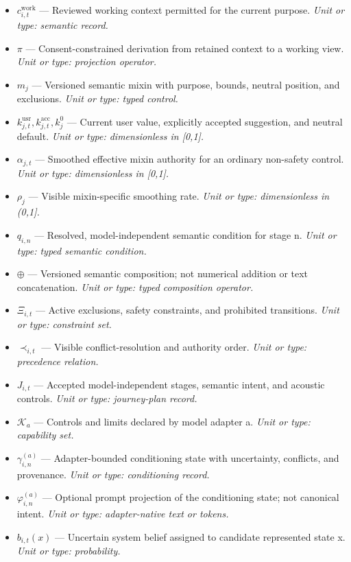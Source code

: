 \begin{itemize}[leftmargin=1.35em,itemsep=0.52em]
  \item ${c^{\mathrm{work}}_{i,t}}$ --- Reviewed working context permitted for the current purpose. \textit{Unit or type: semantic record.}
  \item ${\pi}$ --- Consent-constrained derivation from retained context to a working view. \textit{Unit or type: projection operator.}
  \item ${m_j}$ --- Versioned semantic mixin with purpose, bounds, neutral position, and exclusions. \textit{Unit or type: typed control.}
  \item ${k^{\mathrm{usr}}_{j,t}, k^{\mathrm{acc}}_{j,t}, k^0_j}$ --- Current user value, explicitly accepted suggestion, and neutral default. \textit{Unit or type: dimensionless in [0,1].}
  \item ${\alpha_{j,t}}$ --- Smoothed effective mixin authority for an ordinary non-safety control. \textit{Unit or type: dimensionless in [0,1].}
  \item ${\rho_j}$ --- Visible mixin-specific smoothing rate. \textit{Unit or type: dimensionless in (0,1].}
  \item ${q_{i,n}}$ --- Resolved, model-independent semantic condition for stage n. \textit{Unit or type: typed semantic condition.}
  \item ${\oplus}$ --- Versioned semantic composition; not numerical addition or text concatenation. \textit{Unit or type: typed composition operator.}
  \item ${\Xi_{i,t}}$ --- Active exclusions, safety constraints, and prohibited transitions. \textit{Unit or type: constraint set.}
  \item ${\prec_{i,t}}$ --- Visible conflict-resolution and authority order. \textit{Unit or type: precedence relation.}
  \item ${J_{i,t}}$ --- Accepted model-independent stages, semantic intent, and acoustic controls. \textit{Unit or type: journey-plan record.}
  \item ${\mathcal{K}_a}$ --- Controls and limits declared by model adapter a. \textit{Unit or type: capability set.}
  \item ${\gamma^{(a)}_{i,n}}$ --- Adapter-bounded conditioning state with uncertainty, conflicts, and provenance. \textit{Unit or type: conditioning record.}
  \item ${\varphi^{(a)}_{i,n}}$ --- Optional prompt projection of the conditioning state; not canonical intent. \textit{Unit or type: adapter-native text or tokens.}
  \item ${b_{i,t}(x)}$ --- Uncertain system belief assigned to candidate represented state x. \textit{Unit or type: probability.}

\end{itemize}
